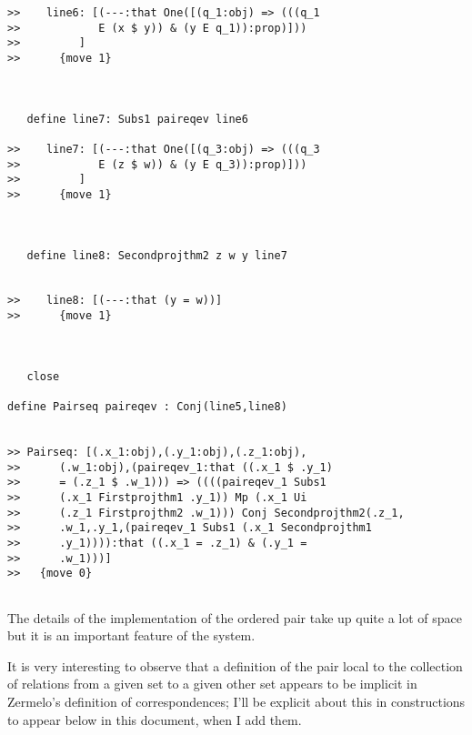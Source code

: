 \documentclass[12pt]{article}
\begin{document}
\begin{verbatim}
>>    line6: [(---:that One([(q_1:obj) => (((q_1
>>            E (x $ y)) & (y E q_1)):prop)]))
>>         ]
>>      {move 1}



   define line7: Subs1 paireqev line6

>>    line7: [(---:that One([(q_3:obj) => (((q_3
>>            E (z $ w)) & (y E q_3)):prop)]))
>>         ]
>>      {move 1}



   define line8: Secondprojthm2 z w y line7


>>    line8: [(---:that (y = w))]
>>      {move 1}



   close

define Pairseq paireqev : Conj(line5,line8)


>> Pairseq: [(.x_1:obj),(.y_1:obj),(.z_1:obj),
>>      (.w_1:obj),(paireqev_1:that ((.x_1 $ .y_1)
>>      = (.z_1 $ .w_1))) => ((((paireqev_1 Subs1
>>      (.x_1 Firstprojthm1 .y_1)) Mp (.x_1 Ui
>>      (.z_1 Firstprojthm2 .w_1))) Conj Secondprojthm2(.z_1,
>>      .w_1,.y_1,(paireqev_1 Subs1 (.x_1 Secondprojthm1
>>      .y_1)))):that ((.x_1 = .z_1) & (.y_1 =
>>      .w_1)))]
>>   {move 0}


\end{verbatim}

The details of the implementation of the ordered pair take up quite a lot of space but it is an important feature of the system.

It is very interesting to observe that a definition of the pair local to the collection of relations from a given set to a given other set appears to be implicit in Zermelo's definition of correspondences;  I'll be explicit about this in constructions to appear below in this document, when I add them.
\end{document}
